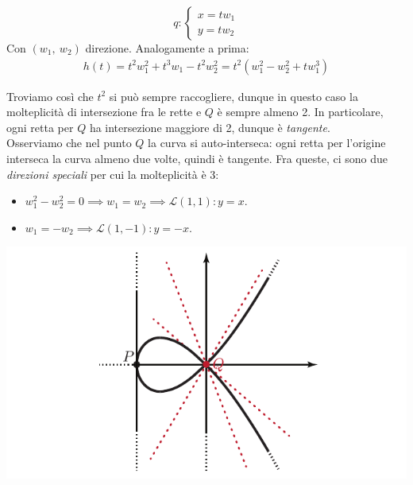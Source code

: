 \begin{example}
\begin{equation*}
		q\colon \begin{cases}
			x=tw_1\\
			y=tw_2
		\end{cases}
	\end{equation*}
	Con $(w_1,\ w_2)$ direzione. Analogamente a prima:
	\begin{gather*}
		h(t)=t^2w_1^2+t^3w_1-t^2w_2^2=t^2(w_1^2-w_2^2+tw_1^3)
	\end{gather*}
\begin{minipage}{0.75\textwidth}
Troviamo così che $t^2$ si può sempre raccogliere, dunque in questo caso la molteplicità di intersezione fra le rette e $Q$ è sempre almeno 2. In particolare, ogni retta per $Q$ ha intersezione maggiore di 2, dunque è \textit{tangente}.\\
Osserviamo che nel punto $Q$ la curva si auto-interseca: ogni retta per l'origine interseca la curva almeno due volte, quindi è tangente. Fra queste, ci sono due \textit{direzioni speciali} per cui la molteplicità è 3:
\begin{itemize}
	\item $w_1^2-w_2^2=0\implies w_1=w_2 \implies \mathcal{L}(1,1) \colon y=x$.
	\item $w_1=-w_2 \implies \mathcal{L}(1,-1) \colon y=-x$.
\end{itemize}
\end{minipage}
\hspace{-12mm}
\begin{minipage}{0.24\textwidth}
	\includegraphics[trim=0cm 0cm 0cm 0cm,clip,scale=0.50]{images/planecurve2.pdf}
\end{minipage}
\end{example}
